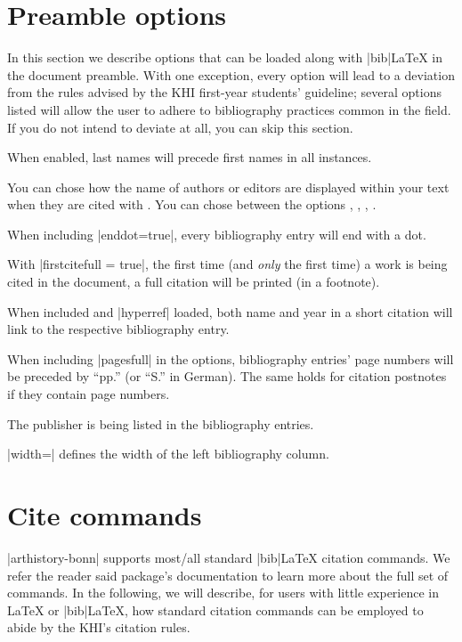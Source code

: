\documentclass[a4paper,
10pt,
ngerman,
english
]{ltxdoc}
\begin{document}
\section{Preamble options}\label{preamble_options}
In this section we describe options that can be loaded along with |bib|\LaTeX{} in the document preamble. 
With one exception, every option will lead to a deviation from the rules advised by the KHI first-year students' guideline; 
several options listed will allow the user to adhere to bibliography practices common in the field. 
If you do not intend to deviate at all, you can skip this section.

When enabled, last names will precede first names in all instances.

You can chose how the name of authors or editors are displayed within your text when they are cited with .
You can chose between the options , , , .

When including |enddot=true|, every bibliography entry will end with a dot.

With |firstcitefull = true|, the first time (and \emph{only} the first time) a work is being cited in the document, a full citation will be printed (in a footnote).

When included and |hyperref| loaded, both name and year in a short citation will link to the respective bibliography entry.

When including |pagesfull| in the options, bibliography entries' page numbers will be preceded by \enquote{pp.} (or \enquote{S.} in German). 
The same holds for citation postnotes if they contain page numbers.

The publisher is being listed in the bibliography entries.

|width=| defines the width of the left bibliography column.


\section{Cite commands}\label{cite-commands}
|arthistory-bonn| supports most/all standard |bib|\LaTeX{} citation commands. We refer the reader said package's documentation to learn more about the full set of commands. 
In the following, we will describe, for users with little experience in \LaTeX{} or |bib|\LaTeX, how standard citation commands can be employed to abide by the KHI's citation rules.
\end{document}
